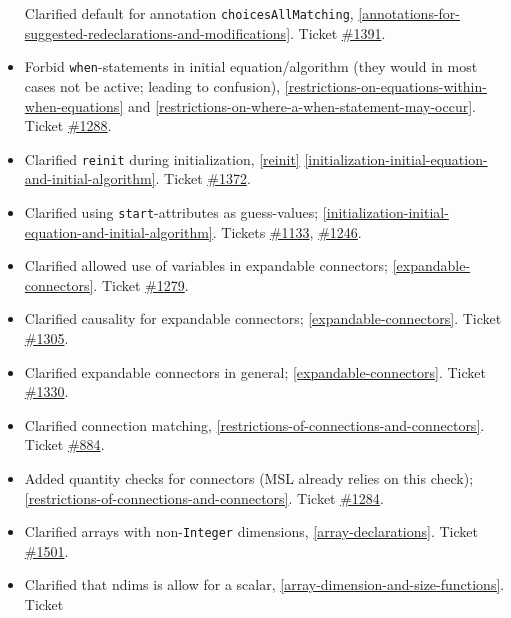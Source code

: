 \begin{itemize}
  Clarified default for annotation \lstinline!choicesAllMatching!, \cref{annotations-for-suggested-redeclarations-and-modifications}.
  Ticket \href{https://github.com/modelica/ModelicaSpecification/issues/1391}{\#1391}.
\item
  Forbid \lstinline!when!-statements in initial equation/algorithm (they would in most cases not be active; leading to confusion), \cref{restrictions-on-equations-within-when-equations} and \cref{restrictions-on-where-a-when-statement-may-occur}.
  Ticket \href{https://github.com/modelica/ModelicaSpecification/issues/1288}{\#1288}.
\item
  Clarified \lstinline!reinit! during initialization, \cref{reinit} \cref{initialization-initial-equation-and-initial-algorithm}.
  Ticket \href{https://github.com/modelica/ModelicaSpecification/issues/1372}{\#1372}.
\item
  Clarified using \lstinline!start!-attributes as guess-values; \cref{initialization-initial-equation-and-initial-algorithm}.
  Tickets \href{https://github.com/modelica/ModelicaSpecification/issues/1133}{\#1133}, \href{https://github.com/modelica/ModelicaSpecification/issues/1246}{\#1246}.
\item
  Clarified allowed use of variables in expandable connectors; \cref{expandable-connectors}. Ticket
  \href{https://github.com/modelica/ModelicaSpecification/issues/1279}{\#1279}.
\item
  Clarified causality for expandable connectors; \cref{expandable-connectors}. Ticket
  \href{https://github.com/modelica/ModelicaSpecification/issues/1305}{\#1305}.
\item
  Clarified expandable connectors in general; \cref{expandable-connectors}. Ticket
  \href{https://github.com/modelica/ModelicaSpecification/issues/1330}{\#1330}.
\item
  Clarified connection matching, \cref{restrictions-of-connections-and-connectors}. Ticket
  \href{https://github.com/modelica/ModelicaSpecification/issues/884}{\#884}.
\item
  Added quantity checks for connectors (MSL already relies on this
  check); \cref{restrictions-of-connections-and-connectors}. Ticket
  \href{https://github.com/modelica/ModelicaSpecification/issues/1284}{\#1284}.
\item
  Clarified arrays with non-\lstinline!Integer! dimensions, \cref{array-declarations}.
  Ticket \href{https://github.com/modelica/ModelicaSpecification/issues/1501}{\#1501}.
\item
  Clarified that ndims is allow for a scalar, \cref{array-dimension-and-size-functions}. Ticket

\end{itemize}
